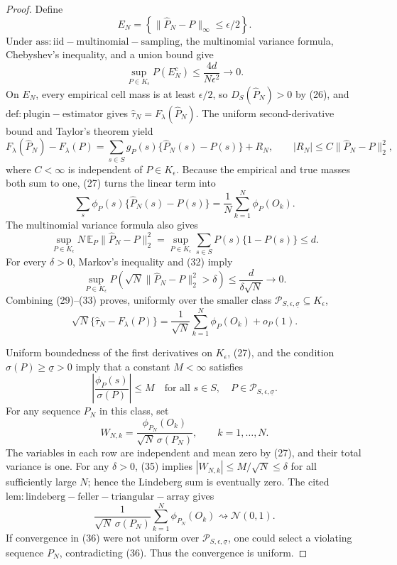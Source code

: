 \documentclass{article}
\begin{document}
\begin{proof}
Define
\[
E_N=\left\{\|\widehat P_N-P\|_\infty\le\epsilon/2\right\}.
\]
Under \(\mathrm{ass:iid-multinomial-sampling}\), the multinomial variance formula, Chebyshev's inequality, and a union bound give
\[
\sup_{P\in K_\epsilon}P(E_N^c)
\le \frac{4d}{N\epsilon^2}\longrightarrow0.                 \tag{29}
\]
On \(E_N\), every empirical cell mass is at least \(\epsilon/2\), so \(D_S(\widehat P_N)>0\) by (26), and \(\mathrm{def:plugin-estimator}\) gives \(\widehat\tau_N=F_\lambda(\widehat P_N)\).  The uniform second-derivative bound and Taylor's theorem yield
\[
F_\lambda(\widehat P_N)-F_\lambda(P)
=\sum_{s\in S}g_P(s)\{\widehat P_N(s)-P(s)\}+R_N,
\qquad
|R_N|\le C\|\widehat P_N-P\|_2^2,                            \tag{30}
\]
where \(C<\infty\) is independent of \(P\in K_\epsilon\).  Because the empirical and true masses both sum to one, (27) turns the linear term into
\[
\sum_s\phi_P(s)\{\widehat P_N(s)-P(s)\}
=\frac1N\sum_{k=1}^N\phi_P(O_k).                             \tag{31}
\]
The multinomial variance formula also gives
\[
\sup_{P\in K_\epsilon}N\,\mathbb E_P
   \|\widehat P_N-P\|_2^2
=\sup_{P\in K_\epsilon}\sum_{s\in S}P(s)\{1-P(s)\}
\le d.                                                        \tag{32}
\]
For every \(\delta>0\), Markov's inequality and (32) imply
\[
\sup_{P\in K_\epsilon}
P\!\left(\sqrt N\|\widehat P_N-P\|_2^2>\delta\right)
\le\frac{d}{\delta\sqrt N}\longrightarrow0.                \tag{33}
\]
Combining (29)--(33) proves, uniformly over the smaller class \(\mathcal P_{S,\epsilon,\underline\sigma}\subseteq K_\epsilon\),
\[
\sqrt N\{\widehat\tau_N-F_\lambda(P)\}
=\frac1{\sqrt N}\sum_{k=1}^N\phi_P(O_k)+o_P(1).             \tag{34}
\]

Uniform boundedness of the first derivatives on \(K_\epsilon\), (27), and the condition \(\sigma(P)\ge\underline\sigma>0\) imply that a constant \(M<\infty\) satisfies
\[
\left|\frac{\phi_P(s)}{\sigma(P)}\right|\le M
\quad\text{for all }s\in S,
\quad P\in\mathcal P_{S,\epsilon,\underline\sigma}.       \tag{35}
\]
For any sequence \(P_N\) in this class, set
\[
W_{N,k}=\frac{\phi_{P_N}(O_k)}{\sqrt N\,\sigma(P_N)},
\qquad k=1,\ldots,N.
\]
The variables in each row are independent and mean zero by (27), and their total variance is one.  For any \(\delta>0\), (35) implies \(|W_{N,k}|\le M/\sqrt N\le\delta\) for all sufficiently large \(N\); hence the Lindeberg sum is eventually zero.  The cited \(\mathrm{lem:lindeberg-feller-triangular-array}\) gives
\[
\frac1{\sqrt N\,\sigma(P_N)}
\sum_{k=1}^N\phi_{P_N}(O_k)
\rightsquigarrow\mathcal N(0,1).                             \tag{36}
\]
If convergence in (36) were not uniform over \(\mathcal P_{S,\epsilon,\underline\sigma}\), one could select a violating sequence \(P_N\), contradicting (36).  Thus the convergence is uniform.


\end{proof}
\end{document}
